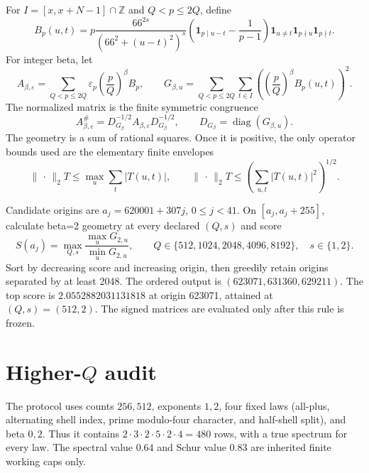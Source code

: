 \documentclass[10pt]{article}
\newcommand{\opnorm}{\lVert\,\cdot\,\rVert_2}
\begin{document}
For $I=[x,x+N-1]\cap\mathbb Z$ and $Q<p\leq2Q$, define
\begin{equation}
B_p(u,t)=p\frac{66^{2s}}{(66^2+(u-t)^2)^s}
\left(\mathbf{1}_{p\mid u-t}-\frac1{p-1}\right)
\mathbf{1}_{u\ne t}\mathbf{1}_{p\nmid u}\mathbf{1}_{p\nmid t}.
\label{eq:block}
\end{equation}
For integer beta, let
\begin{equation}
A_{\beta,\varepsilon}=\sum_{Q<p\leq2Q}\varepsilon_p
\left(\frac pQ\right)^\beta B_p,\qquad
G_{\beta,u}=\sum_{Q<p\leq2Q}\sum_{t\in I}
\left(\left(\frac pQ\right)^\beta B_p(u,t)\right)^2 .
\label{eq:weighted}
\end{equation}
The normalized matrix is the finite symmetric congruence
\begin{equation}
A_{\beta,\varepsilon}^{\#}
=D_{G_\beta}^{-1/2}A_{\beta,\varepsilon}D_{G_\beta}^{-1/2},
\qquad D_{G_\beta}=\operatorname{diag}(G_{\beta,u}).
\label{eq:norm}
\end{equation}
The geometry is a sum of rational squares.  Once it is positive, the only
operator bounds used are the elementary finite envelopes
\begin{equation}
\opnorm{T}\leq\max_u\sum_t|T(u,t)|,\qquad
\opnorm{T}\leq\left(\sum_{u,t}|T(u,t)|^2\right)^{1/2}.
\label{eq:envelopes}
\end{equation}

Candidate origins are $a_j=620001+307j$, $0\leq j<41$.  On
$[a_j,a_j+255]$, calculate beta=2 geometry at every declared $(Q,s)$ and
score
\begin{equation}
S(a_j)=\max_{Q,s}\frac{\max_uG_{2,u}}{\min_uG_{2,u}},
\qquad Q\in\{512,1024,2048,4096,8192\},\quad s\in\{1,2\}.
\label{eq:score}
\end{equation}
Sort by decreasing score and increasing origin, then greedily retain origins
separated by at least 2048.  The ordered output is
$(623071,631360,629211)$.  The top score is
$2.0552882031131818$ at origin 623071, attained at $(Q,s)=(512,2)$.
The signed matrices are evaluated only after this rule is frozen.

\section{Higher-\texorpdfstring{$Q$}{Q} audit}

The protocol uses counts $256,512$, exponents $1,2$, four fixed laws
(all-plus, alternating shell index, prime modulo-four character, and
half-shell split), and beta $0,2$.  Thus it contains
$2\cdot3\cdot2\cdot5\cdot2\cdot4=480$ rows, with a true spectrum for every
law.  The spectral value $0.64$ and Schur value $0.83$ are inherited finite
working caps only.
\end{document}
